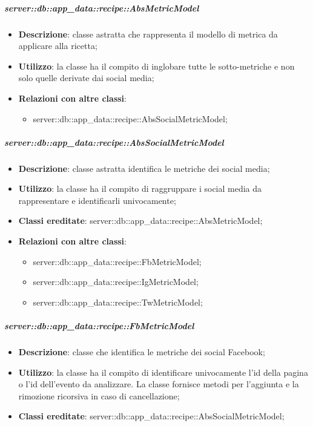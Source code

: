 		\subparagraph{server::db::app\_data::recipe::AbsMetricModel} %
		\label{subp:server_db_app_data_recipe_absmetricmodel}
			\begin{itemize}
				\item \textbf{Descrizione}: classe astratta che rappresenta il modello di metrica da applicare alla ricetta;
				\item \textbf{Utilizzo}: la classe ha il compito di inglobare tutte le sotto-metriche e non solo quelle derivate dai social media;
				\item \textbf{Relazioni con altre classi}:
					\begin{itemize}
						\item server::db::app\_data::recipe::AbsSocialMetricModel;
					\end{itemize}
			\end{itemize}


		\subparagraph{server::db::app\_data::recipe::AbsSocialMetricModel} %
		\label{subp:server_db_app_data_recipe_abssocialmetricmodel}
			\begin{itemize}
				\item \textbf{Descrizione}: classe astratta identifica le metriche dei social media;
				\item \textbf{Utilizzo}: la classe ha il compito di raggruppare i social media da rappresentare e identificarli univocamente;
				\item \textbf{Classi ereditate}: server::db::app\_data::recipe::AbsMetricModel;
				\item \textbf{Relazioni con altre classi}:
					\begin{itemize}
						\item server::db::app\_data::recipe::FbMetricModel;
						\item server::db::app\_data::recipe::IgMetricModel;
						\item server::db::app\_data::recipe::TwMetricModel;
					\end{itemize}
			\end{itemize}


		\subparagraph{server::db::app\_data::recipe::FbMetricModel} %
		\label{subp:server_db_app_data_recipe_fbmetricmodel}
			\begin{itemize}
				\item \textbf{Descrizione}: classe che identifica le metriche dei social Facebook;
				\item \textbf{Utilizzo}: la classe ha il compito di identificare univocamente l'id della pagina o l'id dell'evento da analizzare. La classe fornisce metodi per l'aggiunta e la rimozione ricorsiva in caso di cancellazione;
				\item \textbf{Classi ereditate}: server::db::app\_data::recipe::AbsSocialMetricModel;
			\end{itemize}


